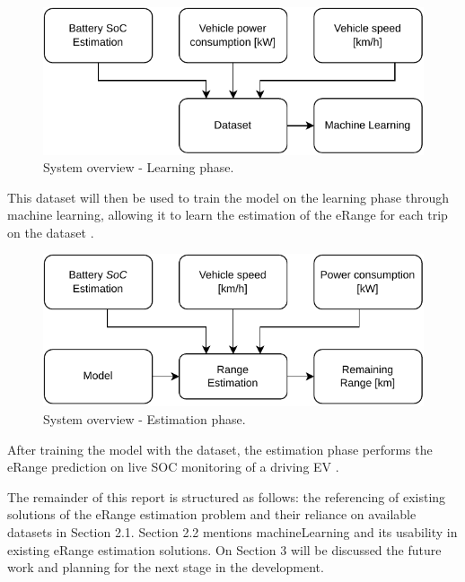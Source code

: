 \begin{figure}[H]
    \begin{center}
        \includegraphics[scale=1.0]{../figures/generic_diagram_learn_phase}
        \caption{System overview - Learning phase.}
        \label{fig:generic_diagram_learn_phase}
    \end{center}
\end{figure}

This \gls{dataset} will then be used to train the model
on the learning phase through machine learning, 
allowing it to learn the estimation of 
the \gls{eRange} for each trip on the \gls{dataset}
.


\begin{figure}[H]
    \begin{center}
        \includegraphics[scale=1.0]{../figures/generic_diagram_estimation_phase}
        \caption{System overview - Estimation phase.}
        \label{fig:generic_diagram_estimation_phase}
    \end{center}
\end{figure}

After training the model with the dataset,
the estimation phase performs the \gls{eRange} prediction
on live \gls{SOC} monitoring of a driving \gls{EV}
.

The remainder of this report is structured as follows: 
the referencing of existing solutions of the \gls{eRange}
estimation problem and their reliance on available
\gls{dataset}s in Section 2.1. 
Section 2.2 mentions \gls{machineLearning} and its 
usability in existing \gls{eRange} estimation solutions.
On Section 3 will be discussed the future work and
planning for the next stage in the development. 